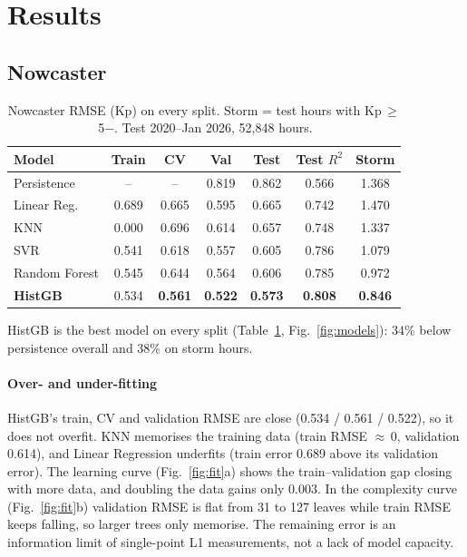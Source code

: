 \documentclass[conference,a4paper]{IEEEtran}
\begin{document}
\section{Results}
\subsection{Nowcaster}
\begin{table}[h]\centering\footnotesize
\caption{Nowcaster RMSE (Kp) on every split. Storm = test hours with Kp\,$\ge$\,5$-$. Test 2020--Jan 2026, 52{,}848 hours.}\label{tab:now}
\setlength{\tabcolsep}{3pt}
\begin{tabular}{@{}lcccccc@{}}\toprule
Model & Train & CV & Val & Test & Test $R^2$ & Storm\\\midrule
Persistence & -- & -- & 0.819 & 0.862 & 0.566 & 1.368\\
Linear Reg. & 0.689 & 0.665 & 0.595 & 0.665 & 0.742 & 1.470\\
KNN & 0.000 & 0.696 & 0.614 & 0.657 & 0.748 & 1.337\\
SVR & 0.541 & 0.618 & 0.557 & 0.605 & 0.786 & 1.079\\
Random Forest & 0.545 & 0.644 & 0.564 & 0.606 & 0.785 & 0.972\\
\textbf{HistGB} & 0.534 & \textbf{0.561} & \textbf{0.522} & \textbf{0.573} & \textbf{0.808} & \textbf{0.846}\\\bottomrule
\end{tabular}
\end{table}

HistGB is the best model on every split (Table~\ref{tab:now}, Fig.~\ref{fig:models}): 34\% below persistence
overall and 38\% on storm hours.

\paragraph{Over- and under-fitting} HistGB's train, CV and validation RMSE are close (0.534 / 0.561 / 0.522), so
it does not overfit. KNN memorises the training data (train RMSE $\approx$\,0, validation 0.614), and Linear
Regression underfits (train error 0.689 above its validation error). The learning curve (Fig.~\ref{fig:fit}a)
shows the train--validation gap closing with more data, and doubling the data gains only 0.003. In the complexity
curve (Fig.~\ref{fig:fit}b) validation RMSE is flat from 31 to 127 leaves while train RMSE keeps falling, so larger
trees only memorise. The remaining error is an information limit of single-point L1 measurements, not a lack of
model capacity.
\end{document}
